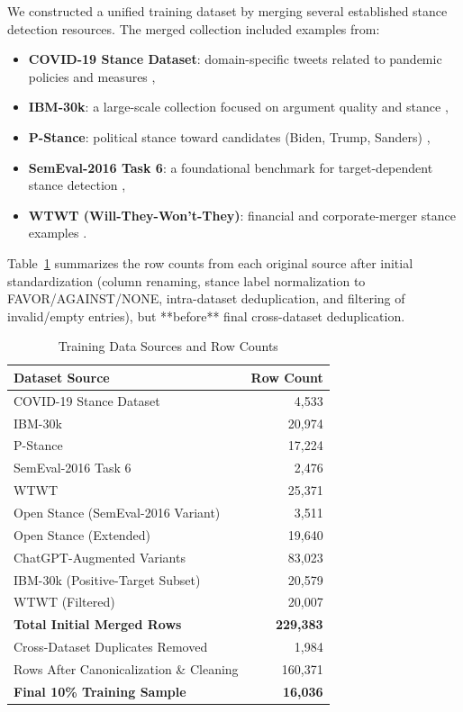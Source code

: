 \documentclass[conference]{IEEEtran}
\begin{document}
We constructed a unified training dataset by merging several established stance detection resources. The merged collection included examples from:

\begin{itemize}
    \item \textbf{COVID-19 Stance Dataset}: domain-specific tweets related to pandemic policies and measures \cite{covid19stance},
    \item \textbf{IBM-30k}: a large-scale collection focused on argument quality and stance \cite{ibm30k},
    \item \textbf{P-Stance}: political stance toward candidates (Biden, Trump, Sanders) \cite{pstance},
    \item \textbf{SemEval-2016 Task 6}: a foundational benchmark for target-dependent stance detection \cite{semeval2016},
    \item \textbf{WTWT (Will-They-Won't-They)}: financial and corporate-merger stance examples \cite{wtwt}.
\end{itemize}

Table~\ref{tab:dataset_sources} summarizes the row counts from each original source after initial standardization (column renaming, stance label normalization to FAVOR/AGAINST/NONE, intra-dataset deduplication, and filtering of invalid/empty entries), but **before** final cross-dataset deduplication.

\begin{table}[htbp]
\centering
\caption{Training Data Sources and Row Counts}
\label{tab:dataset_sources}
\small
\begin{tabular}{l r}
\toprule
\textbf{Dataset Source} & \textbf{Row Count} \\
\midrule
COVID-19 Stance Dataset & 4,533 \\
IBM-30k & 20,974 \\
P-Stance & 17,224 \\
SemEval-2016 Task 6 & 2,476 \\
WTWT & 25,371 \\
Open Stance (SemEval-2016 Variant) & 3,511 \\
Open Stance (Extended) & 19,640 \\
ChatGPT-Augmented Variants & 83,023 \\
IBM-30k (Positive-Target Subset) & 20,579 \\
WTWT (Filtered) & 20,007 \\
\midrule
\textbf{Total Initial Merged Rows} & \textbf{229,383} \\
Cross-Dataset Duplicates Removed & 1,984 \\
Rows After Canonicalization \& Cleaning & 160,371 \\
\midrule
\textbf{Final 10\% Training Sample} & \textbf{16,036} \\
\bottomrule
\end{tabular}
\end{table}
\end{document}
